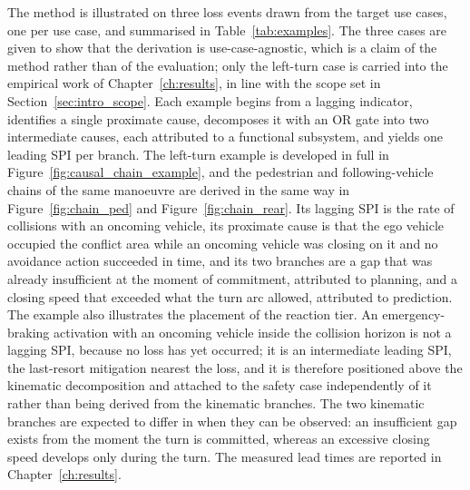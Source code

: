 The method is illustrated on three loss events drawn from the target use cases, one per
use case, and summarised in Table~\ref{tab:examples}. The three cases are given to
show that the derivation is use-case-agnostic, which is a claim of the method rather than
of the evaluation; only the left-turn case is carried into the empirical work of
Chapter~\ref{ch:results}, in line with the scope set in
Section~\ref{sec:intro_scope}. Each example begins from a lagging
indicator, identifies a single proximate cause, decomposes it with an OR gate into two
intermediate causes, each attributed to a functional subsystem, and yields one leading
SPI per branch. The left-turn example is developed in full in
Figure~\ref{fig:causal_chain_example}, and the pedestrian and following-vehicle chains of
the same manoeuvre are derived in the same way in Figure~\ref{fig:chain_ped} and
Figure~\ref{fig:chain_rear}. Its lagging SPI is the rate of collisions
with an oncoming vehicle, its proximate cause is that the ego vehicle occupied the
conflict area while an oncoming vehicle was closing on it and no avoidance action
succeeded in time, and its two branches are a gap that was already insufficient at the
moment of commitment, attributed to planning, and a closing speed that exceeded what
the turn arc allowed, attributed to prediction. The example also illustrates the
placement of the reaction tier. An emergency-braking activation with an oncoming
vehicle inside the collision horizon is not a lagging SPI, because no loss has
yet occurred; it is an intermediate leading SPI, the last-resort mitigation
nearest the loss, and it is therefore positioned above the kinematic decomposition and
attached to the safety case independently of it rather than being derived from the
kinematic branches. The two kinematic branches are expected to differ in when they
can be observed: an insufficient gap exists from the moment the turn is committed,
whereas an excessive closing speed develops only during the turn. The measured lead
times are reported in Chapter~\ref{ch:results}.

